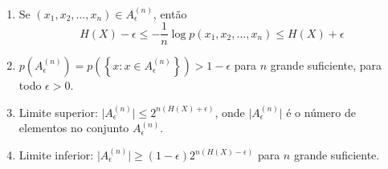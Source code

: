 \begin{theorem}\label{thm:propconjtip}
\ \\ 
\begin{enumerate}
\item\label{prop1conjtip} Se $(x_1, x_2, \ldots, x_n) \in A_\epsilon^{(n)}$, então
      \begin{equation}
      H(X) - \epsilon \leq - \frac{1}{n} \log p(x_1, x_2, \ldots, x_n) \leq H(X) + \epsilon
      \end{equation}
\item\label{prop2conjtip} $p(A_\epsilon^{(n)}) = p\left( \left\{ x: x \in A_\epsilon^{(n)} \right\} \right) > 1 - \epsilon$ para $n$ grande suficiente, para todo $\epsilon > 0$.
\item\label{prop3conjtip} Limite superior: $\vert A_\epsilon^{(n)} \vert \leq 2^{n(H(X)+\epsilon)}$, onde $\vert A_\epsilon^{(n)} \vert$ é o número de elementos no conjunto $A_\epsilon^{(n)}$.
\item\label{prop4conjtip} Limite inferior: $\vert A_\epsilon^{(n)} \vert \geq (1-\epsilon) 2^{n(H(X) - \epsilon)}$ para $n$ grande suficiente.
\end{enumerate}
\end{theorem}

